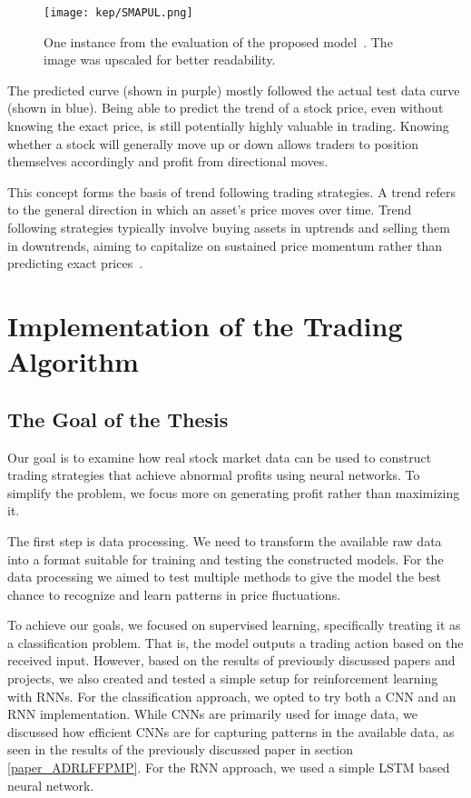 \documentclass[a4paper,oneside,onecolumn,12pt]{book}
\begin{document}
	\begin{figure}[H]
	\begin{center}
		\texttt{[image: kep/SMAPUL.png]}
		\caption{One instance from the evaluation of the proposed model~\cite{LiYuXuLiuMo2023}. The image was upscaled for better readability.}
		\label{fig:evalutaion_SMAPUL}
	\end{center}
	\end{figure}
	The predicted curve (shown in purple) mostly followed the actual test data curve (shown in blue). Being able to predict the trend of a stock price, even without knowing the exact price, is still potentially highly valuable in trading. Knowing whether a stock will generally move up or down allows traders to position themselves accordingly and profit from directional moves.

	This concept forms the basis of trend following trading strategies. A trend refers to the general direction in which an asset's price moves over time. Trend following strategies typically involve buying assets in uptrends and selling them in downtrends, aiming to capitalize on sustained price momentum rather than predicting exact prices~\cite{TFTSS}.

\chapter{Implementation of the Trading Algorithm}

\section{The Goal of the Thesis}
	Our goal is to examine how real stock market data can be used to construct trading strategies that achieve abnormal profits using neural networks. To simplify the problem, we focus more on generating profit rather than maximizing it.

	The first step is data processing. We need to transform the available raw data into a format suitable for training and testing the constructed models. For the data processing we aimed to test multiple methods to give the model the best chance to recognize and learn patterns in price fluctuations.

	To achieve our goals, we focused on supervised learning, specifically treating it as a classification problem. That is, the model outputs a trading action based on the received input. However, based on the results of previously discussed papers and projects, we also created and tested a simple setup for reinforcement learning with RNNs. For the classification approach, we opted to try both a CNN and an RNN implementation. While CNNs are primarily used for image data, we discussed how efficient CNNs are for capturing patterns in the available data, as seen in the results of the previously discussed paper in section \ref{paper_ADRLFFPMP}. For the RNN approach, we used a simple LSTM based neural network.
\end{document}
